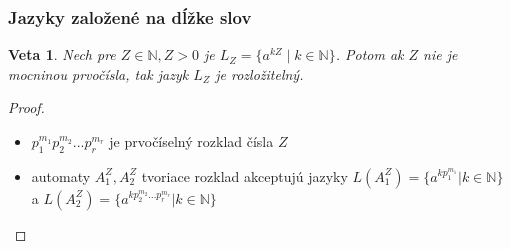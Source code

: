\documentclass[notheorems]{beamer}
\newtheorem{theorem}{Veta}
\begin{document}
\begin{frame}
	\frametitle{Jazyky založené na dĺžke slov}
	
	\begin{theorem}
		Nech pre $ Z \in \mathbb{N}, Z > 0 $ je $ L_Z = \lbrace a^{kZ} \; | \; k \in \mathbb{N} 				\rbrace $. Potom ak $ Z $ nie je mocninou prvočísla, tak jazyk $ L_Z $ je rozložitelný.
	\end{theorem}

\begin{proof}
\begin{figure}[H]
\centering
{}
\end{figure}

\begin{itemize}
\item $ p_{1}^{m_1}p_{2}^{m_2}...p_{r}^{m_r} $ je prvočíselný rozklad čísla $ Z $
\item automaty $ A_1^Z,A_2^Z $ tvoriace rozklad akceptujú jazyky $ L(A_1^Z) = \lbrace a^{kp_{1}^{m_1}} | k \in \mathbb{N} \rbrace $ a $ L(A_2^Z) = \lbrace a^{kp_{2}^{m_2}...p_{r}^{m_r}} | k \in \mathbb{N} \rbrace $
\end{itemize}

\end{proof}

\end{frame}
\end{document}
